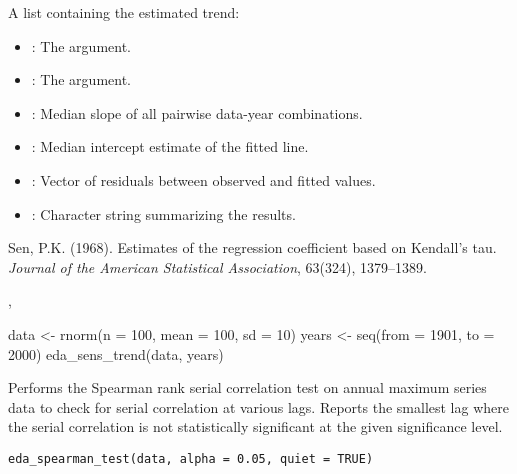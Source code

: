 \documentclass[a4paper]{book}
\begin{document}
%
\begin{Value}
A list containing the estimated trend:
\begin{itemize}

\item{} : The  argument.
\item{} : The  argument.
\item{} : Median slope of all pairwise data-year combinations.
\item{} : Median intercept estimate of the fitted line.
\item{} : Vector of residuals between observed and fitted values.
\item{} : Character string summarizing the results.

\end{itemize}

\end{Value}
%
\begin{References}
Sen, P.K. (1968). Estimates of the regression coefficient based on Kendall's tau.
\emph{Journal of the American Statistical Association}, 63(324), 1379–1389.
\end{References}
%
\begin{SeeAlso}
, 
\end{SeeAlso}
%
\begin{Examples}
\begin{ExampleCode}
data <- rnorm(n = 100, mean = 100, sd = 10)
years <- seq(from = 1901, to = 2000)
eda_sens_trend(data, years)

\end{ExampleCode}
\end{Examples}
%
\begin{Description}
Performs the Spearman rank serial correlation test on annual maximum series
data to check for serial correlation at various lags. Reports the smallest
lag where the serial correlation is not statistically significant at the given
significance level.
\end{Description}
%
\begin{Usage}
\begin{verbatim}
eda_spearman_test(data, alpha = 0.05, quiet = TRUE)
\end{verbatim}
\end{Usage}
\end{document}
